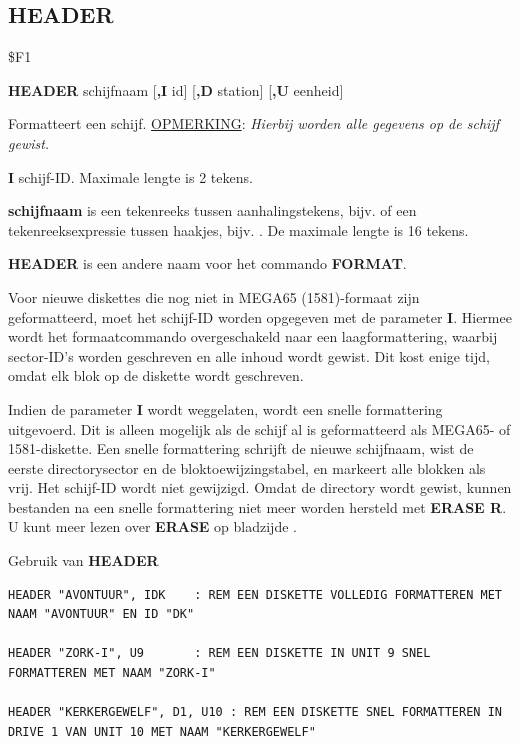 \subsection{HEADER}
\begin{description}[leftmargin=2cm,style=nextline]
\item [Token:]    \$F1

\item [Formaat:]   {\bf HEADER} schijfnaam [{\bf,I} id] [{\bf,D} station] [{\bf,U} eenheid]

\item [Gebruik:]    Formatteert een schijf. \underline{OPMERKING}: {\em Hierbij worden alle gegevens op de schijf gewist.}

                  {\bf I} schijf-ID. Maximale lengte is 2 tekens.

                  {\bf schijfnaam} is een tekenreeks tussen aanhalingstekens, bijv.  of een tekenreeksexpressie tussen haakjes, bijv. . De maximale lengte is 16 tekens.

                  \drivedefinition

                  \unitdefinition

\item [Opmerkingen:]  {\bf HEADER} is een andere naam voor het commando {\bf FORMAT}.

                  Voor nieuwe diskettes die nog niet in MEGA65 (1581)-formaat zijn geformatteerd, moet het schijf-ID worden opgegeven met de parameter {\bf I}. Hiermee wordt het formaatcommando overgeschakeld naar een laagformattering, waarbij sector-ID's worden geschreven en alle inhoud wordt gewist. Dit kost enige tijd, omdat elk blok op de diskette wordt geschreven.

                  Indien de parameter {\bf I} wordt weggelaten, wordt een snelle formattering uitgevoerd. Dit is alleen mogelijk als de schijf al is geformatteerd als MEGA65- of 1581-diskette. Een snelle formattering schrijft de nieuwe schijfnaam, wist de eerste directorysector en de bloktoewijzingstabel, en markeert alle blokken als vrij. Het schijf-ID wordt niet gewijzigd. Omdat de directory wordt gewist, kunnen bestanden na een snelle formattering niet meer worden hersteld met {\bf ERASE R}. U kunt meer lezen over {\bf ERASE} op bladzijde \pageref{BASIC 65 Commands!ERASE}.

\item [Voorbeelden:] Gebruik van {\bf HEADER}

\begin{tcolorbox}[colback=black,coltext=white]
\verbatimfont{\codefont}
\begin{verbatim}
HEADER "AVONTUUR", IDK    : REM EEN DISKETTE VOLLEDIG FORMATTEREN MET NAAM "AVONTUUR" EN ID "DK"

HEADER "ZORK-I", U9       : REM EEN DISKETTE IN UNIT 9 SNEL FORMATTEREN MET NAAM "ZORK-I"

HEADER "KERKERGEWELF", D1, U10 : REM EEN DISKETTE SNEL FORMATTEREN IN DRIVE 1 VAN UNIT 10 MET NAAM "KERKERGEWELF"
\end{verbatim}
\end{tcolorbox}
\end{description}

